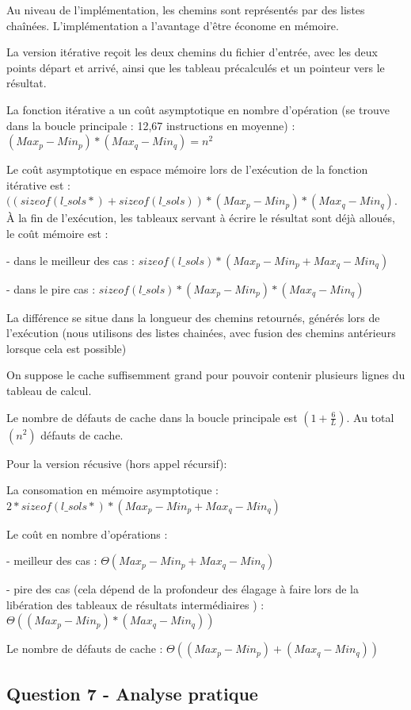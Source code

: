 \documentclass[paper=a4, fontsize=11pt]{scrartcl} %
\begin{document}
Au niveau de l'implémentation, les chemins sont représentés par des listes chaînées.
L'implémentation a l'avantage d'être économe en mémoire.

La version itérative reçoit les deux chemins du fichier d'entrée, avec les deux points départ et arrivé, ainsi que les tableau précalculés et un pointeur vers le résultat.

La fonction itérative a un coût asymptotique en nombre d'opération (se trouve dans la boucle principale : 12,67 instructions en moyenne) : $ (Max_p - Min_p) * (Max_q - Min_q) = n^2$

Le coût asymptotique en espace mémoire lors de l'exécution de la fonction itérative est : $ ((sizeof(l\_sols *) + sizeof(l\_sols)) * (Max_p - Min_p) * (Max_q - Min_q) $.
À la fin de l'exécution, les tableaux servant à écrire le résultat sont déjà alloués, le coût mémoire est :

- dans le meilleur des cas : $sizeof(l\_sols) * (Max_p - Min_p + Max_q - Min_q)$

- dans le pire cas : $ sizeof(l\_sols) * (Max_p - Min_p) * (Max_q - Min_q) $

La différence se situe dans la longueur des chemins retournés, générés lors de l'exécution (nous utilisons des listes chainées, avec fusion des chemins antérieurs lorsque cela est possible)

On suppose le cache suffisemment grand pour pouvoir contenir plusieurs lignes du tableau de calcul.

Le nombre de défauts de cache dans la boucle principale est $(1 + \frac{6}{L})$. Au total $(n^2)$ défauts de cache.

Pour la version récusive (hors appel récursif):

La consomation en mémoire asymptotique : $ 2 * sizeof(l\_sols *) * (Max_p - Min_p + Max_q - Min_q) $

Le coût en nombre d'opérations :

- meilleur des cas : $\Theta(Max_p - Min_p + Max_q - Min_q)$

- pire des cas (cela dépend de la profondeur des élagage à faire lors de la libération des tableaux de résultats intermédiaires ) : $\Theta((Max_p - Min_p) * (Max_q - Min_q))$

Le nombre de défauts de cache : $\Theta((Max_p - Min_p) + (Max_q - Min_q))$

\subsection*{Question 7 - Analyse pratique}
\end{document}
